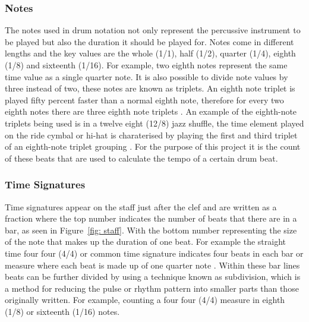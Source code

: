 \documentclass[a4paper, 11pt]{article}
\begin{document}
\subsubsection{Notes}
The notes used in drum notation not only represent the percussive instrument to be played but also the duration it should be played for. Notes come in different lengths and the key values are the whole (1/1), half (1/2), quarter (1/4), eighth (1/8) and sixteenth (1/16). For example, two eighth notes represent the same time value as a single quarter note. It is also possible to divide note values by three instead of two, these notes are known as triplets. An eighth note triplet is played fifty percent faster than a normal eighth note, therefore for every two eighth notes there are three eighth note triplets \cite{drum-note}. An example of the eighth-note triplets being used is in a twelve eight (12/8) jazz shuffle, the time element played on the ride cymbal or hi-hat is charaterised by playing the first and third triplet of an eighth-note triplet grouping \cite{drum-bible}. For the purpose of this project it is the count of these beats that are used to calculate the tempo of a certain drum beat.

\subsubsection{Time Signatures}\label{sec: ts}
Time signatures appear on the staff just after the clef and are written as a fraction where the top number indicates the number of beats that there are in a bar, as seen in Figure~\ref{fig: staff}. With the bottom number representing the size of the note that makes up the duration of one beat. For example the straight time four four (4/4) or common time signature indicates four beats in each bar or measure where each beat is made up of one quarter note \cite{drum-note}. Within these bar lines beats can be further divided by using a technique known as subdivision, which is a method for reducing the pulse or rhythm pattern into smaller parts than those originally written. For example, counting a four four (4/4) measure in eighth (1/8) or sixteenth (1/16) notes. 
\end{document}
